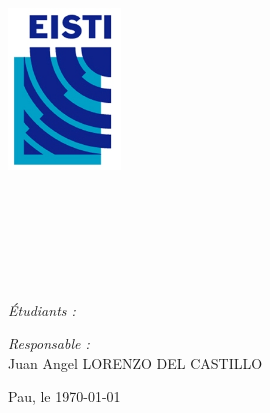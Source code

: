 \begin{titlepage}

\begin{center}

\begin{minipage}[t]{0.48\textwidth}
  \begin{flushleft}
    \includegraphics [width=30mm]{images/logo_eisti.jpg} \\[0.5cm]
    \begin{spacing}{1.5}
      \textsc{\LARGE}
    \end{spacing}
  \end{flushleft}
\end{minipage}
\begin{minipage}[t]{0.48\textwidth}
  \begin{flushright}
  \end{flushright}
\end{minipage} \\[1.5cm]

\textsc{\Large \reportsubject}\\[0.5cm]
\HRule \\[0.4cm]
{\huge \bfseries \reporttitle}\\[0.4cm]
\HRule \\[1.5cm]

\begin{minipage}[t]{0.3\textwidth}
  \begin{flushleft} \large
    \emph{Étudiants :}\\
    \reportauthor
  \end{flushleft}
\end{minipage}
\begin{minipage}[t]{0.6\textwidth}
  \begin{flushright} \large
    \emph{Responsable :} \\
    Juan Angel \textsc{LORENZO DEL CASTILLO} \\
  \end{flushright}
\end{minipage}

\vfill

{\large Pau, le \today}

\end{center}

\end{titlepage}
